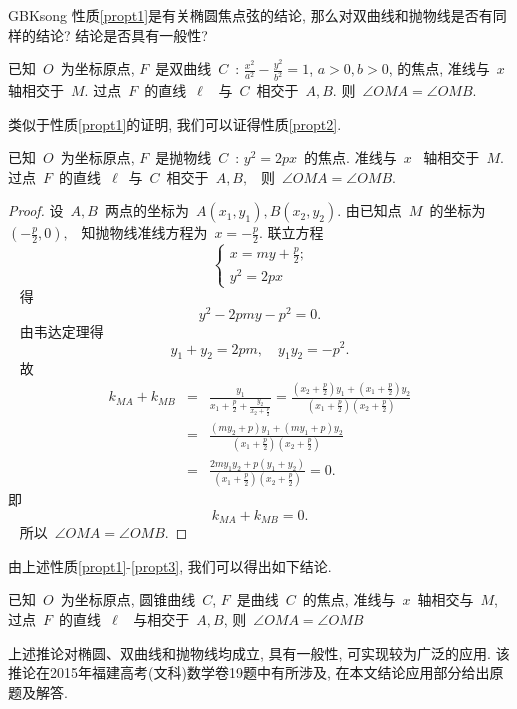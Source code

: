 \documentclass[a4paper, 12pt, twoside]{ctexart}
\begin{document}
\begin{CJK*}{GBK}{song}
    性质\ref{propt1}是有关椭圆焦点弦的结论, 那么对双曲线和抛物线是否有同样的结论? 结论是否具有一般性?
    \begin{propt}\label{propt2}
        已知~$O$~为坐标原点, $F$~是双曲线~$C$~: $\frac{x^2}{a^2}-\frac{y^2}{b^2}=1$, $a>0, b>0$, 的焦点, 准线与~$x$~ 轴相交于~$M$. 过点~$F$~的直线~$\ell$~ 与~$C$~相交于~$A,B$. 则~$\angle O M A=\angle OMB$.
    \end{propt}

    类似于性质\ref{propt1}的证明, 我们可以证得性质\ref{propt2}.
    \begin{propt}\label{propt3}
        已知~$O$~为坐标原点, $F$~是抛物线~$C$~: $y^2=2 p x$~的焦点. 准线与~$x$~ 轴相交于~$M$. 过点~$F$~的直线~$\ell$~与~$C$~相交于~$A,B,$~ 则~$\angle OMA=\angle OMB$.
    \end{propt}
    \begin{proof}
        设~$A,B$~两点的坐标为~$A(x_1, y_1),  B(x_2,y_2)$. 由已知点~$M$~的坐标为~$(-\frac{p}{2}, 0), $~ 知抛物线准线方程为~$x=-\frac{p}{2}$. 联立方程
            $$~\left\{\!\!\!\begin{array}{l}
                x=m y+\frac{p}{2}; \\
                y^2=2 p x
                \end{array}\right.
            $$~
        得
        $$~y^2-2 p m y-p^{2}=0.~$$~
        由韦达定理得
            $$~y_{1}+y_{2}=2 p m, \quad y_1y_{2}=-p^{2}.~$$~
        故
        \begin{eqnarray*}
            k_{MA}+k_{MB}&=&\frac{y_1}{x_1+\frac p2+\frac{y_2}{x_2+\frac p2}} =\frac{(x_2+\frac p2)y_1+(x_1+\frac p2) y_2} {(x_1+\frac p2) (x_2+\frac p2)} \\
            &=&\frac{(my_2+p)y_1+(my_1+p)y_2}{(x_1+\frac p2) (x_2+\frac p2)} \\
            &=&\frac{2my_1y_2+p(y_1+y_2)}{(x_1+\frac p2)(x_2+\frac p2)}
            =0.
        \end{eqnarray*}
    即
        $$~k_{M A}+k_{M B}=0.~$$~
    所以~$\angle O M A=\angle O M B$.
\end{proof}

    由上述性质\ref{propt1}-\ref{propt3}, 我们可以得出如下结论.
    \begin{coro}\label{coro1}
        已知~$O$~为坐标原点, 圆锥曲线~$C$, $F$~是曲线~$C$~的焦点, 准线与~$x$~轴相交与~$M$,  过点~$F$~的直线~$\ell$~ 与相交于~$A, B$,  则~$\angle O M A=\angle O M B$~
    \end{coro}

    上述推论对椭圆、双曲线和抛物线均成立, 具有一般性, 可实现较为广泛的应用. 该推论在2015年福建高考(文科)数学卷19题中有所涉及, 在本文结论应用部分给出原题及解答.


\end{CJK*}
\end{document}
